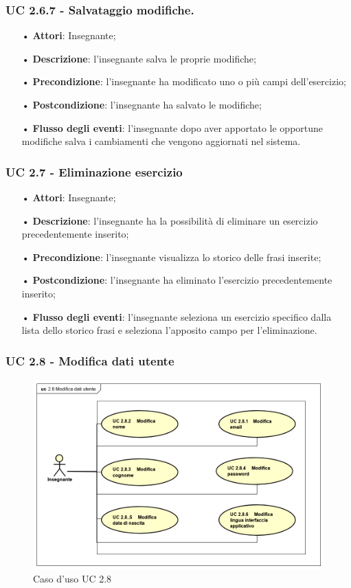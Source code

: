 \subsubsection{UC 2.6.7 - Salvataggio modifiche.} 
\begin{itemize}
	\item[•] \textbf{Attori}: Insegnante;
	\item[•] \textbf{Descrizione}: l'insegnante salva le proprie modifiche;
	\item[•] \textbf{Precondizione}: l'insegnante ha modificato uno o più campi dell'esercizio;
	\item[•] \textbf{Postcondizione}: l'insegnante ha salvato le modifiche;
	\item[•] \textbf{Flusso degli eventi}: l'insegnante dopo aver apportato le opportune modifiche salva i cambiamenti che vengono aggiornati nel sistema.
\end{itemize}


\subsubsection{UC 2.7 - Eliminazione esercizio}
\begin{itemize}
	\item[•] \textbf{Attori}: Insegnante;
	\item[•] \textbf{Descrizione}: l'insegnante ha la possibilità di eliminare un esercizio precedentemente inserito;
	\item[•] \textbf{Precondizione}: l'insegnante visualizza lo storico delle frasi inserite;
	\item[•] \textbf{Postcondizione}: l'insegnante ha eliminato l'esercizio precedentemente inserito;
	\item[•] \textbf{Flusso degli eventi}: l'insegnante seleziona un esercizio specifico dalla lista dello storico frasi e seleziona l'apposito campo per l'eliminazione.
\end{itemize}


\subsubsection{UC 2.8 - Modifica dati utente}
\begin{figure}[H]
\centering
\includegraphics[width=12cm, keepaspectratio]{img/modificadatiutenteinsegnante1.png} 
\caption{Caso d'uso UC 2.8}
\end{figure}

